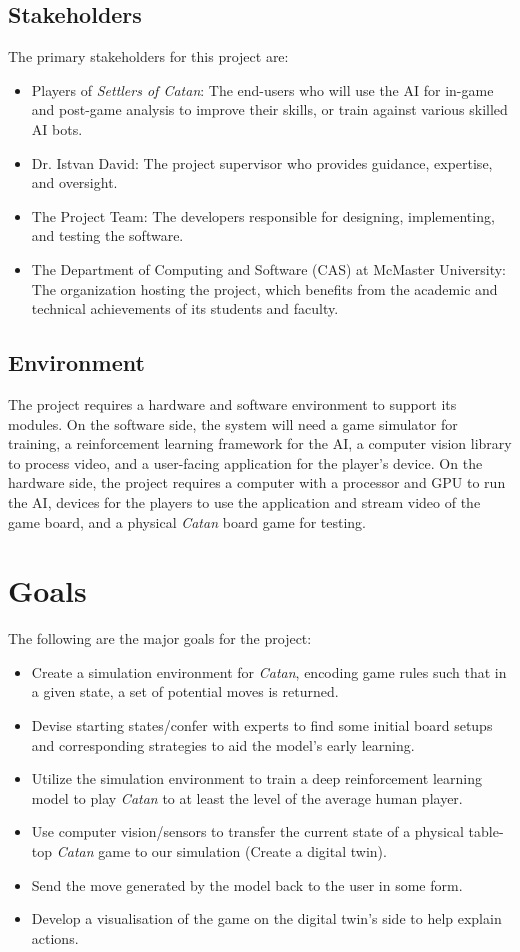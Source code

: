 \documentclass{article}
\begin{document}
\subsection{Stakeholders}\label{subsec:stakeholders}
The primary stakeholders for this project are:
\begin{itemize}
    \item Players of \emph{Settlers of Catan}: The end-users who will use the AI for in-game and post-game analysis to improve their skills, or train against various skilled AI bots.
    \item Dr. Istvan David: The project supervisor who provides guidance, expertise, and oversight.
    \item The Project Team: The developers responsible for designing, implementing, and testing the software.
    \item The Department of Computing and Software (CAS) at McMaster University: The organization hosting the project, which benefits from the academic and technical achievements of its students and faculty.
\end{itemize}

\subsection{Environment}
The project requires a hardware and software environment to support its modules. On the software side, the system will need a game simulator for training, a reinforcement learning framework for the AI, a computer vision library to process video, and a user-facing application for the player's device. On the hardware side, the project requires a computer with a processor and GPU to run the AI, devices for the players to use the application and stream video of the game board, and a physical \emph{Catan} board game for testing.

\section{Goals}\label{sec:goals}
The following are the major goals for the project:
\begin{itemize}
    \item Create a simulation environment for \emph{Catan}, encoding game rules such that in a given state, a set of potential moves is returned.
    \item Devise starting states/confer with experts to find some initial board setups and corresponding strategies to aid the model’s early learning.
    \item Utilize the simulation environment to train a deep reinforcement learning model to play \emph{Catan} to at least the level of the average human player.
    \item Use computer vision/sensors to transfer the current state of a physical table-top \emph{Catan} game to our simulation (Create a digital twin).
    \item Send the move generated by the model back to the user in some form.
    \item Develop a visualisation of the game on the digital twin’s side to help explain actions.
\end{itemize}
\end{document}
